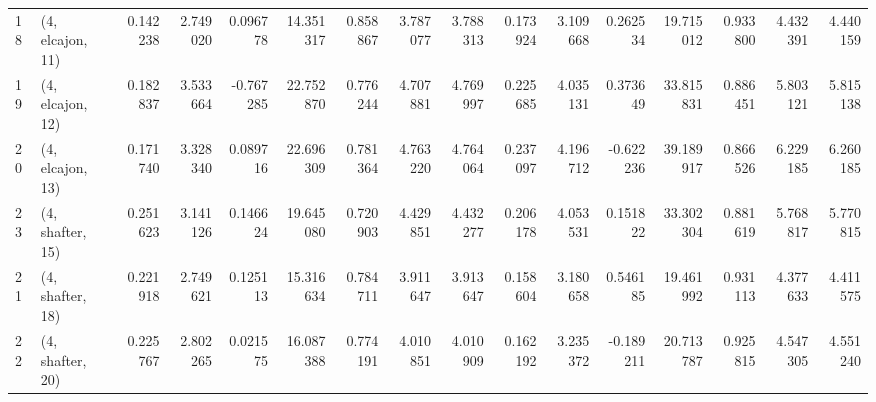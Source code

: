 \begin{tabular}{llrrrrrrrrrrrrrr}
18 &  (4, elcajon, 11) &   0.142238 &  2.749020 &  0.096778 &  14.351317 &  0.858867 &   3.787077 &  3.788313 &  0.173924 &  3.109668 &  0.262534 &   19.715012 &  0.933800 &   4.432391 &   4.440159 \\
19 &  (4, elcajon, 12) &   0.182837 &  3.533664 & -0.767285 &  22.752870 &  0.776244 &   4.707881 &  4.769997 &  0.225685 &  4.035131 &  0.373649 &   33.815831 &  0.886451 &   5.803121 &   5.815138 \\
20 &  (4, elcajon, 13) &   0.171740 &  3.328340 &  0.089716 &  22.696309 &  0.781364 &   4.763220 &  4.764064 &  0.237097 &  4.196712 & -0.622236 &   39.189917 &  0.866526 &   6.229185 &   6.260185 \\
23 &  (4, shafter, 15) &   0.251623 &  3.141126 &  0.146624 &  19.645080 &  0.720903 &   4.429851 &  4.432277 &  0.206178 &  4.053531 &  0.151822 &   33.302304 &  0.881619 &   5.768817 &   5.770815 \\
21 &  (4, shafter, 18) &   0.221918 &  2.749621 &  0.125113 &  15.316634 &  0.784711 &   3.911647 &  3.913647 &  0.158604 &  3.180658 &  0.546185 &   19.461992 &  0.931113 &   4.377633 &   4.411575 \\
22 &  (4, shafter, 20) &   0.225767 &  2.802265 &  0.021575 &  16.087388 &  0.774191 &   4.010851 &  4.010909 &  0.162192 &  3.235372 & -0.189211 &   20.713787 &  0.925815 &   4.547305 &   4.551240 \\
\bottomrule
\end{tabular}
